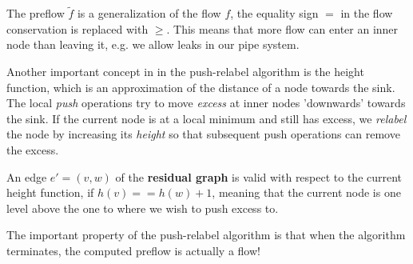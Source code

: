 \begin{definition}[preflow]
	The preflow $\tilde f$ is a generalization of the flow $f$, the equality sign $=$ in the flow conservation is replaced with $\geq$. This means that more flow can enter an inner node than leaving it, e.g. we allow leaks in our pipe system.
\end{definition}

Another important concept in in the push-relabel algorithm is the height function, which is an approximation of the distance of a node towards the sink. The local \textit{push} operations try to move \textit{excess} at inner nodes 'downwards' towards the sink. If the current node is at a local minimum and still has excess, we \textit{relabel} the node by increasing its \textit{height} so that subsequent push operations can remove the excess.
\begin{definition}
	An edge $e'=(v,w)$ of the \textbf{residual graph} is valid with respect to the current height function, if $h(v)==h(w)+1$, meaning that the current node is one level above the one to where we wish to push excess to.
\end{definition}

The important property of the push-relabel algorithm is that when the algorithm terminates, the computed preflow is actually a flow!




